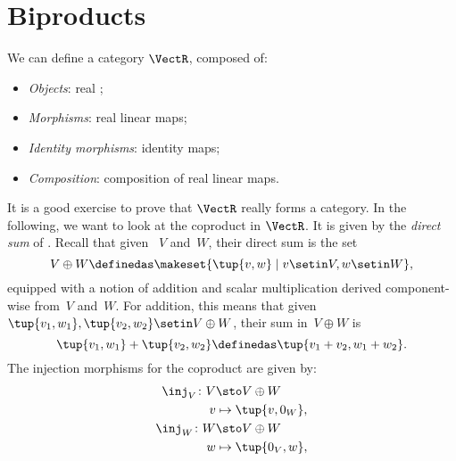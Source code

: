 
\section{Biproducts}

\publictodomessage


\begin{example}
    We can define a category $\VectR$, composed of: %
    \begin{itemize}
        \item \emph{Objects}: real ;
        \item \emph{Morphisms}: real linear maps;
        \item \emph{Identity morphisms}: identity maps;
        \item \emph{Composition}: composition of real linear maps.
    \end{itemize}
    It is a good exercise to prove that $\VectR$ really forms a category.
    In the following, we want to look at the coproduct in $\VectR$.
    It is given by the \emph{direct sum} of .
    Recall that given ~$V$ and~$W$, their direct sum is the set
    \begin{equation}
        V\oplus W\definedas \makeset{\tup{v,w}\mid v\setin V,w\setin W},
    \end{equation}
    equipped with a notion of addition and scalar multiplication derived component-wise from~$V$ and~$W$.
    For addition, this means that given~$\tup{v_1,w_1}, \tup{v_2,w_2}\setin V\oplus W$, their sum in~$V \oplus W$ is
    \begin{equation}
        \tup{v_1,w_1}+\tup{v_2,w_2}\definedas \tup{v_1+v_2,w_1+w_2}.
    \end{equation}
    The injection morphisms for the coproduct are given by:
    \begin{equation}
        \begin{aligned}
            \inj_V \colon V & \sto V\oplus W \\
            v               & \mapsto \tup{v,0_W}, \\
            \inj_W \colon W & \sto V\oplus W \\
            w               & \mapsto \tup{0_V,w},
        \end{aligned}

\end{equation}
\end{example}
